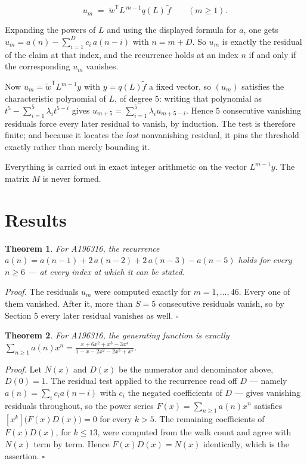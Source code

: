 \documentclass[11pt]{article}
\newtheorem{theorem}{Theorem}
\theoremstyle{definition}
\begin{document}
\[u_m \;=\; \tilde w^{\mathsf T} L^{\,m-1} q(L)\,\tilde f \qquad (m \ge 1).\]

Expanding the powers of $L$ and using the displayed formula for $a$, one gets $u_m = a(n) - \sum_{i=1}^{D} c_i\,a(n-i)$ with $n = m + D$. So $u_m$ is exactly the residual of the claim at that index, and the recurrence holds at an index $n$ if and only if the corresponding $u_m$ vanishes.

Now $u_m = \tilde w^{\mathsf T} L^{m-1} y$ with $y = q(L)\tilde f$ a fixed vector, so $(u_m)$ satisfies the characteristic polynomial of $L$, of degree $5$: writing that polynomial as $t^{5} - \sum_{i=1}^{5} \lambda_i t^{5-i}$ gives $u_{m+5} = \sum_{i=1}^{5} \lambda_i u_{m+5-i}$. Hence $5$ consecutive vanishing residuals force every later residual to vanish, by induction. The test is therefore finite; and because it locates the {\itshape last} nonvanishing residual, it pins the threshold exactly rather than merely bounding it.

Everything is carried out in exact integer arithmetic on the vector $L^{m-1}y$. The matrix $M$ is never formed.

\section{Results}

\begin{theorem} For A196316, the recurrence $a(n) = a(n-1) + 2\,a(n-2) + 2\,a(n-3) - a(n-5)$ holds for every $n \ge 6$ --- at every index at which it can be stated.\end{theorem}

{\itshape Proof.} The residuals $u_m$ were computed exactly for $m = 1,\dots,46$. Every one of them vanished. After it, more than $S = 5$ consecutive residuals vanish, so by Section 5 every later residual vanishes as well. $\square$

\begin{theorem} For A196316, the generating function is exactly $\sum_{n\ge 1} a(n)x^n = \frac{x + 6x^{2} + x^{3} - 3x^{4}}{1 - x - 2x^{2} - 2x^{3} + x^{5}}$.\end{theorem}

{\itshape Proof.} Let $N(x)$ and $D(x)$ be the numerator and denominator above, $D(0)=1$. The residual test applied to the recurrence read off $D$ --- namely $a(n) = \sum_i c_i a(n-i)$ with $c_i$ the negated coefficients of $D$ --- gives vanishing residuals throughout, so the power series $F(x)=\sum_{n\ge 1}a(n)x^n$ satisfies $[x^k]\bigl(F(x)D(x)\bigr) = 0$ for every $k > 5$. The remaining coefficients of $F(x)D(x)$, for $k \le 13$, were computed from the walk count and agree with $N(x)$ term by term. Hence $F(x)D(x) = N(x)$ identically, which is the assertion. $\square$
\end{document}
